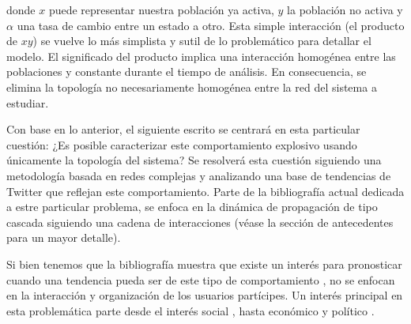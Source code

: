 \documentclass[../main.tex]{subfiles}
\begin{document}
donde $x$ puede representar nuestra población ya activa,  $y$ la población no activa y $\alpha$ una tasa de cambio entre un estado a otro. Esta simple interacción (el producto de $xy$) se vuelve lo más simplista y sutil de lo problemático para detallar el modelo. El significado del producto implica una interacción homogénea entre las poblaciones y constante durante el tiempo de análisis. En consecuencia, se elimina la topología no necesariamente homogénea entre la red del sistema a estudiar.

Con base en lo anterior, el siguiente escrito se centrará en esta particular cuestión: ¿Es posible caracterizar este comportamiento explosivo usando únicamente la topología del sistema? Se resolverá esta cuestión siguiendo una metodología basada en redes complejas y analizando una base de tendencias de Twitter que reflejan este comportamiento. Parte de la bibliografía actual dedicada a estre particular problema, se enfoca en la dinámica de propagación de tipo cascada siguiendo una cadena de interacciones (véase la sección de antecedentes para un mayor detalle).

Si bien tenemos que la bibliografía muestra que existe un interés para pronosticar cuando una tendencia pueda ser de este tipo de comportamiento \cite{Mathioudakis2010, Keeling2005}, no se  enfocan en la interacción y organización de los usuarios partícipes. Un interés principal en esta problemática parte desde el interés social \cite{Barabsi2005}, hasta económico y político \cite{Chen2021}.


\end{document}
